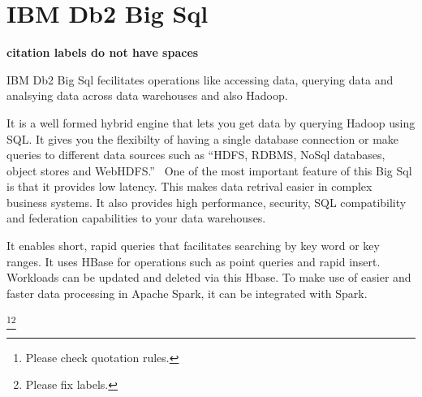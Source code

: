\section{IBM Db2 Big Sql}

{\bf citation labels do not have spaces}

IBM Db2 Big Sql fecilitates operations like accessing data, querying data and
analsying data across data warehouses and also Hadoop.

It is a well formed hybrid engine that lets you get data by querying 
Hadoop using SQL. It gives you the flexibilty of having a single database
connection or make queries to different data sources such as ``HDFS, RDBMS,
NoSql databases, object stores and WebHDFS.''~\cite{IBM DB2 Bi Sql}
One of the most important feature of this Big Sql is that it provides
low latency. This makes data retrival easier in complex business systems.
It also provides high performance, security, SQL compatibility and federation
capabilities to your data warehouses. 

It enables short, rapid queries that facilitates searching by key word or key 
ranges. It uses HBase for operations such as point queries and rapid insert.
Workloads can be updated and deleted via this Hbase. To make use of easier and
faster data processing in Apache Spark, it can be integrated with Spark.

\cite{IBM DB2 Big Sql}\footnote{Please check quotation rules.}\footnote{Please fix labels.}
 
